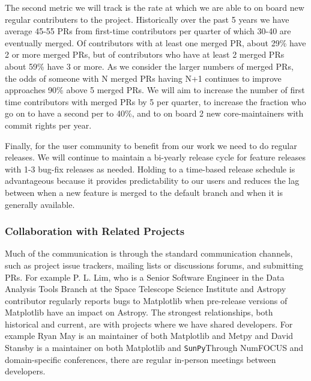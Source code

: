\documentclass[12pt]{article}
\numberwithin{page}{section}
\begin{document}
The second metric we will track is the rate at which we are able to on board
new regular contributers to the project.  Historically over the past 5 years we
have average 45-55 PRs from first-time contributors per quarter of which 30-40
are eventually merged.  Of contributors with at least one merged PR, about 29\%
have 2 or more merged PRs, but of contributors who have at least 2 merged PRs
about 59\% have 3 or more.  As we consider the larger numbers of merged PRs,
the odds of someone with N merged PRs having N+1 continues to improve
approaches 90\% above 5 merged PRs.  We will aim to increase the number of
first time contributors with merged PRs by 5 per quarter, to increase the
fraction who go on to have a second per to 40\%, and to on board 2 new
core-maintainers with commit rights per year.

Finally, for the user community to benefit from our work we need to do
regular releases.  We will continue to maintain a bi-yearly release
cycle for feature releases with 1-3 bug-fix releases as needed.
Holding to a time-based release schedule is advantageous because it
provides predictability to our users and reduces the lag between when a
new feature is merged to the default branch and when it is generally
available.


\subsubsection{Collaboration with Related Projects}


Much of the communication is through the standard communication channels, such
as project issue trackers, mailing lists or discussions forums, and submitting
PRs.  For example P. L. Lim, who is a Senior Software Engineer in the Data
Analysis Tools Branch at the Space Telescope Science Institute and Astropy
contributor regularly reports bugs to Matplotlib when pre-release versions of
Matplotlib have an impact on Astropy.  The strongest relationships, both
historical and current, are with projects where we have shared developers.
For example Ryan May is an maintainer of both Matplotlib and Metpy and David
Stansby is a maintainer on both Matplotlib and \texttt{SunPy}Through NumFOCUS
and domain-specific conferences, there are regular in-person meetings between
developers.
\end{document}
